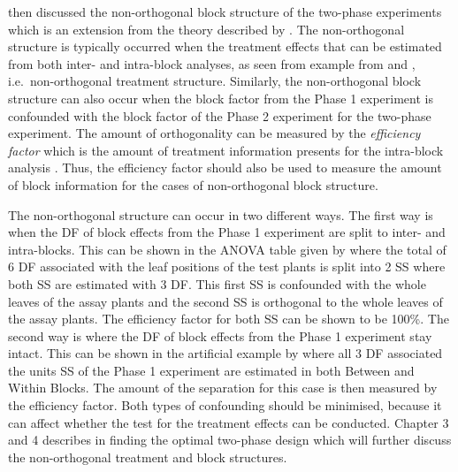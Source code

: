 \documentclass[11pt,a4paper]{article}
\begin{document}
\cite{Wood1988} then discussed the non-orthogonal block structure of the two-phase experiments which is an extension from the theory described by \cite{Curnow1959}. The non-orthogonal structure is typically occurred when the treatment effects that can be estimated from both inter- and intra-block analyses, as seen from example from \cite{McIntyre1955} and \cite{Curnow1959}, i.e.\ non-orthogonal treatment structure. Similarly, the non-orthogonal block structure can also occur when the block factor from the Phase 1 experiment is confounded with the block factor of the Phase 2 experiment for the two-phase experiment. The amount of orthogonality can be measured by the \emph{efficiency factor} which is the amount of treatment information presents for the intra-block analysis \citep{Yates1936}. Thus, the efficiency factor should also be used to measure the amount of block information for the cases of non-orthogonal block structure. 

The non-orthogonal structure can occur in two different ways. The first way is when the DF of block effects from the Phase 1 experiment are split to inter- and intra-blocks. This can be shown in the ANOVA table given by \cite{Curnow1959} where the total of 6 DF associated with the leaf positions of the test plants is split into 2 SS where both SS are estimated with 3 DF. This first SS is confounded with the whole leaves of the assay plants and the second SS is orthogonal to the whole leaves of the assay plants. The efficiency factor for both SS can be shown to be 100\%. The second way is where the DF of block effects from the Phase 1 experiment stay intact. This can be shown in the artificial example by \cite{Wood1988} where all 3 DF associated the units SS of the Phase 1 experiment are estimated in both Between and Within Blocks. The amount of the separation for this case is then measured by the efficiency factor. Both types of confounding should be minimised, because it can affect whether the test for the treatment effects can be conducted.   Chapter 3 and 4 describes in finding the optimal two-phase design which will further discuss the non-orthogonal treatment and block structures. 
\end{document}
